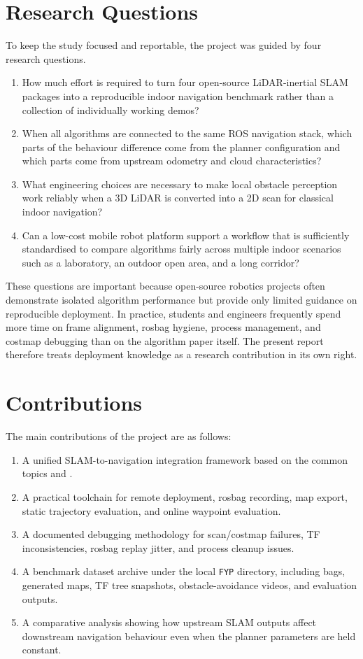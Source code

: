\documentclass[12pt,a4paper]{report}
\begin{document}
\section{Research Questions}
To keep the study focused and reportable, the project was guided by four research questions.
\begin{enumerate}[leftmargin=2em]
    \item How much effort is required to turn four open-source LiDAR-inertial SLAM packages into a reproducible indoor navigation benchmark rather than a collection of individually working demos?
    \item When all algorithms are connected to the same ROS navigation stack, which parts of the behaviour difference come from the planner configuration and which parts come from upstream odometry and cloud characteristics?
    \item What engineering choices are necessary to make local obstacle perception work reliably when a 3D LiDAR is converted into a 2D scan for classical indoor navigation?
    \item Can a low-cost mobile robot platform support a workflow that is sufficiently standardised to compare algorithms fairly across multiple indoor scenarios such as a laboratory, an outdoor open area, and a long corridor?
\end{enumerate}

These questions are important because open-source robotics projects often demonstrate isolated algorithm performance but provide only limited guidance on reproducible deployment. In practice, students and engineers frequently spend more time on frame alignment, rosbag hygiene, process management, and costmap debugging than on the algorithm paper itself. The present report therefore treats deployment knowledge as a research contribution in its own right.

\section{Contributions}
The main contributions of the project are as follows:
\begin{enumerate}[leftmargin=2em]
    \item A unified SLAM-to-navigation integration framework based on the common topics  and .
    \item A practical toolchain for remote deployment, rosbag recording, map export, static trajectory evaluation, and online waypoint evaluation.
    \item A documented debugging methodology for scan/costmap failures, TF inconsistencies, rosbag replay jitter, and process cleanup issues.
    \item A benchmark dataset archive under the local \texttt{FYP} directory, including bags, generated maps, TF tree snapshots, obstacle-avoidance videos, and evaluation outputs.
    \item A comparative analysis showing how upstream SLAM outputs affect downstream navigation behaviour even when the planner parameters are held constant.
\end{enumerate}
\end{document}
